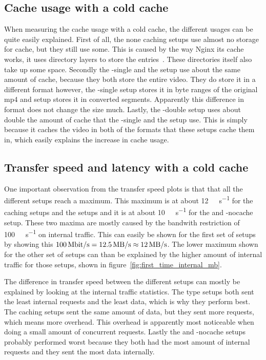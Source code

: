 \documentclass[twoside,openright]{uva-bachelor-thesis}
\newcommand{\mbps}[1]{\SI[per-mode=symbol]{#1}{\mega\bit\per\second}}
\newcommand{\Mbps}[1]{\SI[per-mode=symbol]{#1}{\mega\byte\per\second}}
\begin{document}
\subsection{Cache usage with a cold cache}
When measuring the cache usage with a cold cache, the different usages can be
quite easily explained. First of all, the none caching setups use almost no
storage for cache, but they still use some. This is caused by the way Nginx
its cache works, it uses directory layers to store the
entries~\autocite{nginxcachelevels}. These directories itself also take up
some space. Secondly the \lt-single and the \cdn setup use about the same amount
of cache, because they both store the entire video. They do store it in a
different format however, the \lt-single setup stores it in byte ranges of the
original mp4 and \cdn setup stores it in converted segments. Apparently this
difference in format does not change the size much. Lastly, the \lt-double setup
uses about double the amount of cache that the \lt-single and the \cdn setup
use. This is simply because it caches the video in both of the formats that
these setups cache them in, which easily explains the increase in cache usage.

\subsection{Transfer speed and latency with a cold cache}
One important observation from the transfer speed plots is that that all the
different setups reach a maximum. This maximum is at about \Mbps{12} for the
caching \lt setups and the \cdn setups and it is at about \Mbps{10} for the
\ipp and \lt-nocache setup. These two maxima are mostly caused by the bandwith
restriction of \mbps{100} on internal traffic. This can easily be shown for the
first set of setups by showing this $\mbps{100} = \Mbps{12.5} \approx
\Mbps{12}$. The lower maximum shown for the other set of setups can than be
explained by the higher amount of internal traffic for those setups, shown in
figure~\ref{fig:first_time_internal_mb}.

The difference in transfer speed between the different setups can mostly be
explained by looking at the internal traffic statistics. The \cdn type setups
both sent the least internal requests and the least data, which is why they
perform best. The caching \lt setups sent the same amount of data, but they sent
more requests, which means more overhead. This overhead is apparently most
noticeable when doing a small amount of concurrent requests. Lastly the \ipp and
\lt-nocache setups probably performed worst because they both had the most
amount of internal requests and they sent the most data internally.
\end{document}
